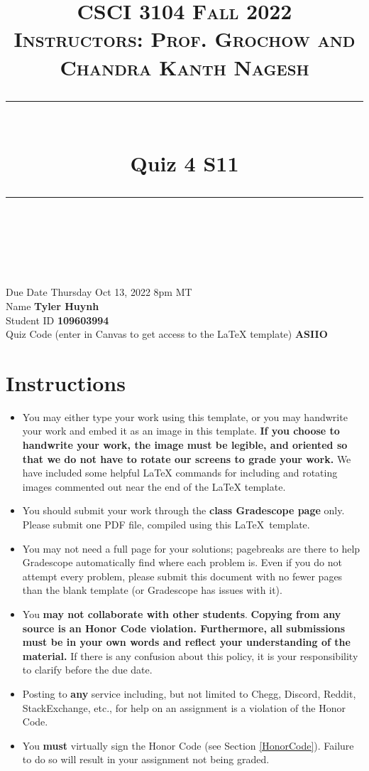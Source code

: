 \documentclass[11pt]{article}
\title{
\normalfont \normalsize 
\textsc{CSCI 3104 Fall 2022 \\ 
Instructors: Prof. Grochow and Chandra Kanth Nagesh} \\
[10pt] 
\rule{\linewidth}{0.5pt} \\[6pt] 
\huge Quiz 4 S11 \\
\rule{\linewidth}{2pt}  \\[10pt]
}
\date{}
\theoremstyle{definition}
\theoremstyle{definition}
\theoremstyle{definition}
\begin{document}

\maketitle


\noindent
Due Date \dotfill Thursday Oct 13, 2022 8pm MT \\
Name \dotfill \textbf{Tyler Huynh} \\
Student ID \dotfill \textbf{109603994} \\
Quiz Code (enter in Canvas to get access to the LaTeX template) \dotfill \textbf{ASIIO}


\tableofcontents

\section*{Instructions}
 \begin{itemize}
	\item You may either type your work using this template, or you may handwrite your work and embed it as an image in this template. \textbf{If you choose to handwrite your work, the image must be legible, and oriented so that we do not have to rotate our screens to grade your work.} We have included some helpful LaTeX commands for including and rotating images commented out near the end of the LaTeX template.
	\item You should submit your work through the \textbf{class Gradescope page} only. Please submit one PDF file, compiled using this \LaTeX \ template.
	\item You may not need a full page for your solutions; pagebreaks are there to help Gradescope automatically find where each problem is. Even if you do not attempt every problem, please submit this document with no fewer pages than the blank template (or Gradescope has issues with it).

	\item You \textbf{may not collaborate with other students}. \textbf{Copying from any source is an Honor Code violation. Furthermore, all submissions must be in your own words and reflect your understanding of the material.} If there is any confusion about this policy, it is your responsibility to clarify before the due date. 

	\item Posting to \textbf{any} service including, but not limited to Chegg, Discord, Reddit, StackExchange, etc., for help on an assignment is a violation of the Honor Code.

	\item You \textbf{must} virtually sign the Honor Code (see Section \ref{HonorCode}). Failure to do so will result in your assignment not being graded.
\end{itemize}
\end{document}
